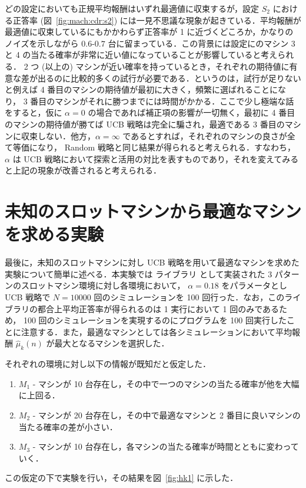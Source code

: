 \documentclass{jsarticle}
\def\hmukn{\hat{\mu}_k (n)}
\begin{document}
どの設定においても正規平均報酬はいずれ最適値に収束するが，設定 $S_2$ における正答率 (図~\ref{fig:mach:cdr:s2}) には一見不思議な現象が起きている．平均報酬が最適値に収束しているにもかかわらず正答率が 1 に近づくどころか，かなりのノイズを示しながら $0.6$-$0.7$ 台に留まっている．この背景には設定にのマシン 3 と 4 の当たる確率が非常に近い値になっていることが影響していると考えられる． 2 つ (以上の) マシンが近い確率を持っているとき，それぞれの期待値に有意な差が出るのに比較的多くの試行が必要である．というのは，試行が足りないと例えば 4 番目のマシンの期待値が最初に大きく，頻繁に選ばれることになり， 3 番目のマシンがそれに勝つまでには時間がかかる．ここで少し極端な話をすると，仮に $\alpha = 0$ の場合であれば補正項の影響が一切無く，最初に 4 番目のマシンの期待値が勝てば UCB 戦略は完全に騙され，最適である 3 番目のマシンに収束しない．他方，$ \alpha = \infty$ であるとすれば，それぞれのマシンの良さが全て等価になり， Random 戦略と同じ結果が得られると考えられる．すなわち， $\alpha$ は UCB 戦略において探索と活用の対比を表すものであり，それを変えてみると上記の現象が改善されると考えられる．

\section{未知のスロットマシンから最適なマシンを求める実験}\label{sec:hk1}

最後に，未知のスロットマシンに対し UCB 戦略を用いて最適なマシンを求めた実験について簡単に述べる．本実験では ライブラリ として実装された 3 パターンのスロットマシン環境に対し各環境において， $\alpha = 0.18$ をパラメータとし UCB 戦略で $N = 10000$ 回のシミュレーションを 100 回行った．なお，このライブラリの都合上平均正答率が得られるのは 1 実行において 1 回のみであるため， 100 回のシミュレーションを実現するのにプログラムを 100 回実行したことに注意する．また，最適なマシンとしては各シミュレーションにおいて平均報酬 $\hmukn$ が最大となるマシンを選択した．

それぞれの環境に対し以下の情報が既知だと仮定した．
\begin{enumerate}
\item $M_1$ - マシンが 10 台存在し，その中で一つのマシンの当たる確率が他を大幅に上回る．
\item $M_2$ - マシンが 20 台存在し，その中で最適なマシンと 2 番目に良いマシンの当たる確率の差が小さい．
\item $M_3$ - マシンが 10 台存在し，各マシンの当たる確率が時間とともに変わっていく．
\end{enumerate}
この仮定の下で実験を行い，その結果を図~\ref{fig:hk1} に示した．
\end{document}
